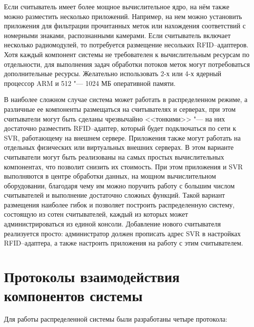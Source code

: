 Если считыватель имеет более мощное вычислительное ядро, на нём также можно разместить несколько приложений. Например, на нем можно установить приложения для фильтрации прочитанных меток или нахождения соответствий с номерными знаками, распознанными камерами. Если считыватель включает несколько радиомодулей, то потребуется размещение несольких RFID--адаптеров. Хотя каждый компонент системы не требователен к вычислительным ресурсам по отдельности, для выполнения задач обработки потоков меток могут потребоваться дополнительные ресурсы. Желательно использовать 2-х или 4-х ядерный процессор ARM и 512 "--- 1024 МБ оперативной памяти.

В наиболее сложном случае система может работать в распределенном режиме, а различные ее компоненты размещаться на считывателях и серверах, при этом считыватели могут быть сделаны чрезвычайно <<тонкими>> "--- на них достаточно разместить RFID--адаптер, который будет подключаться по сети к SVR, работающему на внешнем сервере. Приложения также могут работать на отдельных физических или виртуальных внешних серверах. В этом варианте считыватели могут быть реализованы на самых простых вычислительных компонентах, что позволит снизить их стоимость. При этом приложения и SVR выполняются в центре обработки данных, на мощном вычислительном оборудовании, благодаря чему им можно поручить работу с большим числом считывателей и выполнение достаточно сложных функций. Такой вариант размещения наиболее гибок и позволяет построить распределенную систему, состоящую из сотен считывателей, каждый из которых может администрироваться из единой консоли. Добавление нового считывателя реализуется просто: администратор должен прописать адрес SVR в настройках RFID--адаптера, а также настроить приложения на работу с этим считывателем.



\section{Протоколы взаимодействия компонентов системы}\label{sec:ch5_protocols}

Для работы распределенной системы были разработаны четыре протокола:

